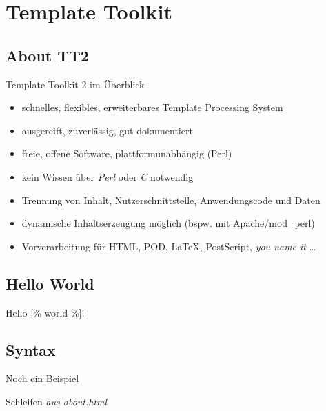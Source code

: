 \documentclass[hyperref={pdfpagelabels=false}]{beamer}
\begin{document}
\section{Template Toolkit}

\subsection{About TT2}

\begin{frame}{Template Toolkit 2 im Überblick}
    \begin{itemize}
        \item schnelles, flexibles, erweiterbares Template Processing System
        \item ausgereift, zuverlässig, gut dokumentiert
        \pause
        \item freie, offene Software, plattformunabhängig (Perl)
        \item kein Wissen über \emph{Perl} oder \emph{C} notwendig
        \pause
        \item Trennung von Inhalt, Nutzerschnittstelle, Anwendungscode und Daten
        \item dynamische Inhaltserzeugung möglich (bspw. mit Apache/mod\_perl)
        \pause
        \item Vorverarbeitung für HTML, POD, \LaTeX, PostScript, \emph{you name it} \dots
    \end{itemize}
\end{frame}

\subsection{Hello World}

\begin{frame}{Hello [\% world \%]!}
\end{frame}

\subsection{Syntax}

\begin{frame}{Noch ein Beispiel}
\end{frame}

\begin{frame}{Schleifen}
    \emph{aus about.html}
\end{frame}
\end{document}
